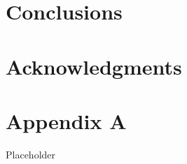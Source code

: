 \documentclass[12pt,oneside]{book}
\begin{document}
%
%
%
%
%
%
%
%


\chapter{Conclusions}
\label{chap:Conclusions}

\chapter{Acknowledgments}
\label{chap:Acknowledgments}



\appendix

\chapter{Appendix A}

Placeholder
\end{document}
